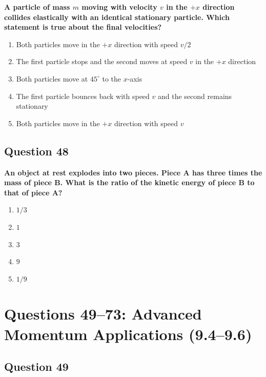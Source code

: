 \documentclass[12pt,letterpaper]{article}
\begin{document}
\begin{questionbox}
\textbf{A particle of mass $m$ moving with velocity $v$ in the $+x$ direction collides elastically with an identical stationary particle. Which statement is true about the final velocities?}

\begin{enumerate}[label=\alph*)]
    \item Both particles move in the $+x$ direction with speed $v/2$
    \item The first particle stops and the second moves at speed $v$ in the $+x$ direction
    \item Both particles move at $45^\circ$ to the $x$-axis
    \item The first particle bounces back with speed $v$ and the second remains stationary
    \item Both particles move in the $+x$ direction with speed $v$
\end{enumerate}
\end{questionbox}

\subsection{Question 48}

\begin{questionbox}
\textbf{An object at rest explodes into two pieces. Piece A has three times the mass of piece B. What is the ratio of the kinetic energy of piece B to that of piece A?}

\begin{enumerate}[label=\alph*)]
    \item $1/3$
    \item $1$
    \item $3$
    \item $9$
    \item $1/9$
\end{enumerate}
\end{questionbox}

\section{Questions 49--73: Advanced Momentum Applications (9.4--9.6)}

\subsection{Question 49}
\end{document}
